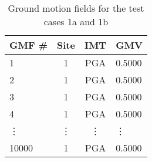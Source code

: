 \begin{table}[htbp]

\centering
\begin{tabular}{ l c c l }

\hline
\rowcolor{anti-flashwhite}
\bf{GMF #} & \bf{Site} & \bf{IMT} & \bf{GMV}\\
\hline
1 & 1 & PGA & 0.5000 \\
2 & 1 & PGA & 0.5000 \\
3 & 1 & PGA & 0.5000 \\
4 & 1 & PGA & 0.5000 \\
\vdots & \vdots & \vdots & \vdots \\
10000 & 1 & PGA & 0.5000 \\
\hline
\end{tabular}

\caption{Ground motion fields for the test cases 1a and 1b}
\label{tab:scenario-gmfs-identical}
\end{table}